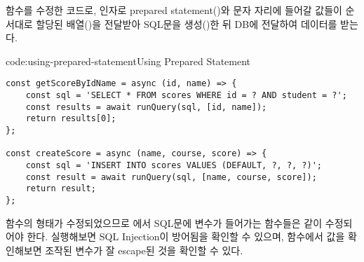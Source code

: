 \는  함수를 수정한 코드로, 인자로 prepared statement()와  문자 자리에 들어갈 값들이 순서대로 할당된 배열()을 전달받아 SQL문을 생성()한 뒤 DB에 전달하여 데이터를 받는다.

\begin{codeenv}{code:using-prepared-statement}{Using Prepared Statement}\begin{verbatim}
const getScoreByIdName = async (id, name) => {
    const sql = 'SELECT * FROM scores WHERE id = ? AND student = ?';
    const results = await runQuery(sql, [id, name]);
    return results[0];
};

const createScore = async (name, course, score) => {
    const sql = 'INSERT INTO scores VALUES (DEFAULT, ?, ?, ?)';
    const result = await runQuery(sql, [name, course, score]);
    return result;
};
\end{verbatim}
\end{codeenv}

 함수의 형태가 수정되었으므로 에서 SQL문에 변수가 들어가는 함수들은 \와 같이 수정되어야 한다. \과 \을 실행해보면 SQL Injection이 방어됨을 확인할 수 있으며,  함수에서  값을 확인해보면 조작된 변수가 잘 escape된 것을 확인할 수 있다.
